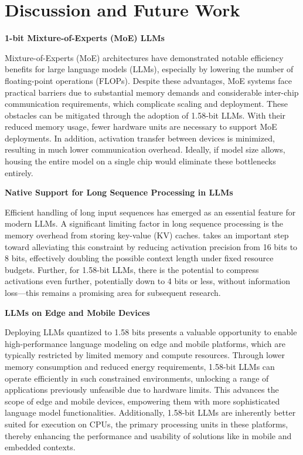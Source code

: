 \section{Discussion and Future Work}

\textbf{1-bit Mixture-of-Experts (MoE) LLMs}

Mixture-of-Experts (MoE) architectures have demonstrated notable efficiency benefits for large language models (LLMs), especially by lowering the number of floating-point operations (FLOPs). Despite these advantages, MoE systems face practical barriers due to substantial memory demands and considerable inter-chip communication requirements, which complicate scaling and deployment. These obstacles can be mitigated through the adoption of 1.58-bit LLMs. With their reduced memory usage, fewer hardware units are necessary to support MoE deployments. In addition, activation transfer between devices is minimized, resulting in much lower communication overhead. Ideally, if model size allows, housing the entire model on a single chip would eliminate these bottlenecks entirely.

\textbf{Native Support for Long Sequence Processing in LLMs}

Efficient handling of long input sequences has emerged as an essential feature for modern LLMs. A significant limiting factor in long sequence processing is the memory overhead from storing key-value (KV) caches.  takes an important step toward alleviating this constraint by reducing activation precision from 16 bits to 8 bits, effectively doubling the possible context length under fixed resource budgets. Further, for 1.58-bit LLMs, there is the potential to compress activations even further, potentially down to 4 bits or less, without information loss—this remains a promising area for subsequent research.

\textbf{LLMs on Edge and Mobile Devices}

Deploying LLMs quantized to 1.58 bits presents a valuable opportunity to enable high-performance language modeling on edge and mobile platforms, which are typically restricted by limited memory and compute resources. Through lower memory consumption and reduced energy requirements, 1.58-bit LLMs can operate efficiently in such constrained environments, unlocking a range of applications previously unfeasible due to hardware limits. This advances the scope of edge and mobile devices, empowering them with more sophisticated language model functionalities. Additionally, 1.58-bit LLMs are inherently better suited for execution on CPUs, the primary processing units in these platforms, thereby enhancing the performance and usability of solutions like  in mobile and embedded contexts.

